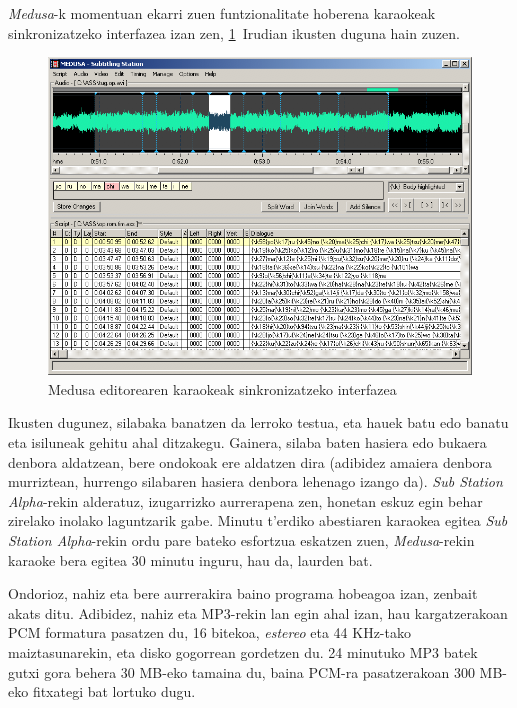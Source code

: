 \textit{Medusa}-k momentuan ekarri zuen funtzionalitate hoberena karaokeak sinkronizatzeko interfazea izan zen, \ref{medusa-karaoke}~Irudian ikusten duguna hain zuzen.
\begin{figure}[htb]
\begin{center}
\includegraphics[width=\columnwidth, natwidth=800pt, natheight=600pt]{Pictures/Chapter2/medusa-karaoke.png}
\caption{Medusa editorearen karaokeak sinkronizatzeko interfazea}
\label{medusa-karaoke}
\end{center}
\end{figure}

Ikusten dugunez, silabaka banatzen da lerroko testua, eta hauek batu edo banatu eta isiluneak gehitu ahal ditzakegu. Gainera, silaba baten hasiera edo bukaera denbora aldatzean, bere ondokoak ere aldatzen dira (adibidez amaiera denbora murriztean, hurrengo silabaren hasiera denbora lehenago izango da). \textit{Sub Station Alpha}-rekin alderatuz, izugarrizko aurrerapena zen, honetan eskuz egin behar zirelako inolako laguntzarik gabe. Minutu t'erdiko abestiaren karaokea egitea \textit{Sub Station Alpha}-rekin ordu pare bateko esfortzua eskatzen zuen, \textit{Medusa}-rekin karaoke bera egitea 30 minutu inguru, hau da, laurden bat.

Ondorioz, nahiz eta bere aurrerakira baino programa hobeagoa izan, zenbait akats ditu. Adibidez, nahiz eta MP3-rekin lan egin ahal izan, hau kargatzerakoan PCM formatura pasatzen du, 16 bitekoa, \textit{estereo} eta 44 KHz-tako maiztasunarekin, eta disko gogorrean gordetzen du. 24 minutuko MP3 batek gutxi gora behera 30 MB-eko tamaina du, baina PCM-ra pasatzerakoan 300 MB-eko fitxategi bat lortuko dugu.

